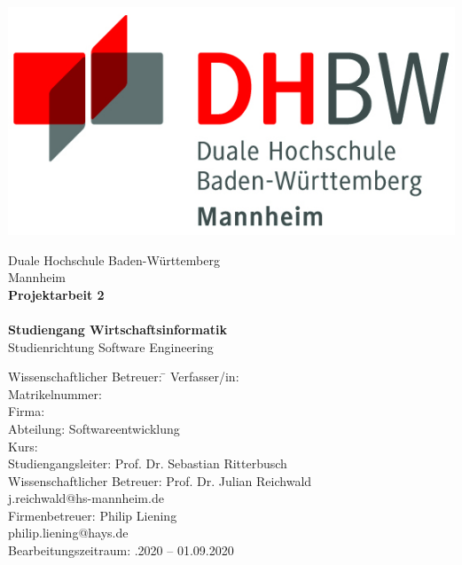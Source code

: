 \begin{titlepage}
\begin{minipage}{\textwidth}
		\vspace{-2cm}
		\noindent 
		\hfill   \includegraphics{img/logo.jpg}
\end{minipage}
\vspace{1em}
\sffamily
\begin{center}
	\textsf{\large{}Duale Hochschule Baden-W\"urttemberg\\[1.5mm] Mannheim}\\[2em]
	\textsf{\textbf{\Large{}Projektarbeit 2}}\\[3mm]
	\textsf{\textbf{\DerTitelDerArbeit}} \\[1.5cm]
	\textsf{\textbf{\Large{}Studiengang Wirtschaftsinformatik}\\[3mm] \textsf{Studienrichtung Software Engineering}}
	
	\vspace{3em}
\vfill

\begin{minipage}{\textwidth}

\begin{tabbing}
	Wissenschaftlicher Betreuer: \hspace{0.85cm}\=\kill
	Verfasser/in: \> \DerAutorDerArbeit \\[1.5mm]
	Matrikelnummer:  \\[1.5mm]
	Firma: \> \DerNameDerFirma  \\[1.5mm]
	Abteilung: \> Softwareentwicklung \\[1.5mm]
	Kurs: \> \DieKursbezeichnung \\[1.5mm]
	Studiengangsleiter: \> Prof. Dr. Sebastian Ritterbusch  \\[1.5mm]
	Wissenschaftlicher Betreuer: \> Prof. Dr. Julian Reichwald \\
	\> j.reichwald@hs-mannheim.de \\
	Firmenbetreuer: \> Philip Liening \\
	\> philip.liening@hays.de \\
	Bearbeitungszeitraum: .2020 -- 01.09.2020
\end{tabbing}
\end{minipage}

\end{center}

\end{titlepage}